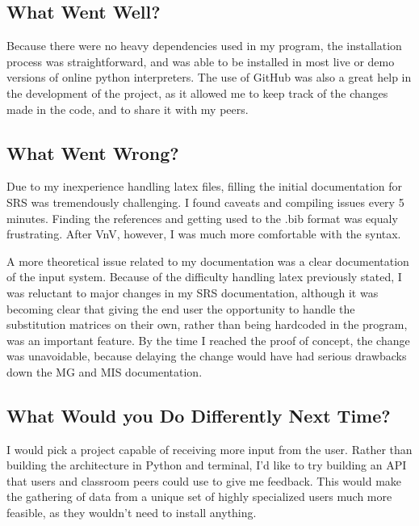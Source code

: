 \documentclass{article}
\begin{document}
\subsection{What Went Well?}


Because there were no heavy dependencies used in my program, the installation process 
was straightforward, and \progname{} was able to be installed in most live or demo versions 
of online python interpreters. 
The use of GitHub was also a great help in the development of the project, 
as it allowed me to keep track of the changes made in the code, and to share it with my peers.

\subsection{What Went Wrong?}

Due to my inexperience handling latex files, filling the initial 
documentation for SRS was tremendously challenging. I found caveats and compiling 
issues every 5 minutes. Finding the references and getting used to the .bib format was 
equaly frustrating. After VnV, however, I was much more comfortable with the syntax.

A more theoretical issue related to my documentation was 
a clear documentation of the input system. Because of the difficulty 
handling latex previously stated, I was reluctant to major changes in my 
SRS documentation, although it was becoming clear that giving the end user the opportunity to 
handle the substitution matrices on their own, rather than being hardcoded in the program, 
was an important feature. By the time I reached the proof of concept, the change was 
unavoidable, because delaying the change would have had serious drawbacks down the 
MG and MIS documentation.

\subsection{What Would you Do Differently Next Time?}

I would pick a project capable of receiving more input from the user. 
Rather than building the architecture in Python and terminal, I'd like to try 
building an API that users and classroom peers could use to give me feedback. 
This would make the gathering of data from a unique set of highly specialized 
users much more feasible, as they wouldn't need to install anything.
\end{document}
